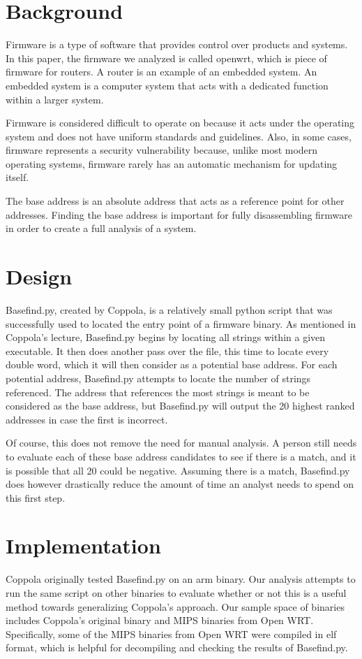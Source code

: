 \documentclass[letterpaper,twocolumn,10pt]{article}
\begin{document}
\section{Background}
Firmware is a type of software that provides control over products and systems. In this paper, the firmware we analyzed is called openwrt, which is piece of firmware for routers. A router is an example of an embedded system. An embedded system is a computer system that acts with a dedicated function within a larger system.               

Firmware is considered difficult to operate on because it acts under the operating system and does not have uniform standards and guidelines. Also, in some cases, firmware represents a security vulnerability because, unlike most modern operating systems, firmware rarely has an automatic mechanism for updating itself\cite{firmwaresecurity2014}. 

The base address is an absolute address that acts as a reference point for other addresses. Finding the base address is important for fully disassembling firmware in order to create a full analysis of a system. 

\section{Design}
Basefind.py, created by Coppola\cite{cloudscale2013}, is a relatively small python script that was successfully used to located the entry point of a firmware binary. As mentioned in Coppola's lecture, Basefind.py begins by locating all strings within a given executable. It then does another pass over the file, this time to locate every double word, which it will then consider as a potential base address. For each potential address, Basefind.py attempts to locate the number of strings referenced. The address that references the most strings is meant to be considered as the base address, but Basefind.py will output the 20 highest ranked addresses in case the first is incorrect. 

Of course, this does not remove the need for manual analysis. A person still needs to evaluate each of these base address candidates to see if there is a match, and it is possible that all 20 could be negative. Assuming there is a match, Basefind.py does however drastically reduce the amount of time an analyst needs to spend on this first step. 

\section{Implementation}
Coppola\cite{cloudscale2013} originally tested Basefind.py on an arm binary. Our analysis attempts to run the same script on other binaries to evaluate whether or not this is a useful method towards generalizing Coppola's approach. Our sample space of binaries includes Coppola's original binary and MIPS binaries from Open WRT. Specifically, some of the MIPS binaries from Open WRT were compiled in elf format, which is helpful for decompiling and checking the results of Basefind.py.
\end{document}
